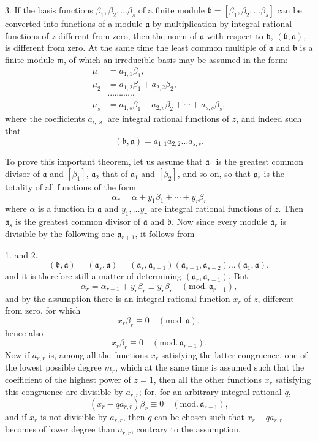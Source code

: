 \documentclass{article}
\begin{document}
3. If the basis functions $\beta_{1}, \beta_{2}, \ldots \beta_{s}$ of a finite module $\mathfrak{b} = [\beta_{1}, \beta_{2}, \ldots \beta_{s}]$ can be converted into functions of a module $\mathfrak{a}$ by multiplication by integral rational functions of $z$ different from zero, then the norm of $\mathfrak{a}$ with respect to $\mathfrak{b}$, $(\mathfrak{b}, \mathfrak{a})$, is different from zero. At the same time the least common multiple of $\mathfrak{a}$ and $\mathfrak{b}$ is a finite module $\mathfrak{m}$, of which an irreducible basis may be assumed in the form:
\[ \begin{aligned} \mu_{1} &= a_{1,1}\beta_{1}, \\ \mu_{2} &= a_{1,2}\beta_{1} + a_{2,2}\beta_{2}, \\ &\cdots\cdots\cdots\cdots \\ \mu_{s} &= a_{1,s}\beta_{1} + a_{2,s}\beta_{2} + \cdots + a_{s,s}\beta_{s}, \end{aligned} \]
where the coefficients $a_{\iota,\varkappa}$ are integral rational functions of $z$, and indeed such that
\[ (\mathfrak{b}, \mathfrak{a}) = a_{1,1}a_{2,2}\ldots a_{s,s}. \]

To prove this important theorem, let us assume that $\mathfrak{a}_{1}$ is the greatest common divisor of $\mathfrak{a}$ and $[\beta_{1}]$, $\mathfrak{a}_{2}$ that of $\mathfrak{a}_{1}$ and $[\beta_{2}]$, and so on, so that $\mathfrak{a}_{r}$ is the totality of all functions of the form
\[ \alpha_{r} = \alpha + y_{1}\beta_{1} + \cdots + y_{r}\beta_{r} \]
where $\alpha$ is a function in $\mathfrak{a}$ and $y_{1}, \ldots y_{r}$ are integral rational functions of $z$. Then $\mathfrak{a}_{s}$ is the greatest common divisor of $\mathfrak{a}$ and $\mathfrak{b}$. Now since every module $\mathfrak{a}_{r}$ is divisible by the following one $\mathfrak{a}_{r+1}$, it follows from

1. and 2.
\[ (\mathfrak{b}, \mathfrak{a}) = (\mathfrak{a}_{s}, \mathfrak{a}) = (\mathfrak{a}_{s}, \mathfrak{a}_{s-1})(\mathfrak{a}_{s-1}, \mathfrak{a}_{s-2})\ldots(\mathfrak{a}_{1}, \mathfrak{a}), \]
and it is therefore still a matter of determining $(\mathfrak{a}_{r}, \mathfrak{a}_{r-1})$. But
\[ \alpha_{r} = \alpha_{r-1} + y_{r}\beta_{r} \equiv y_{r}\beta_{r} \quad (\text{mod.}\,\mathfrak{a}_{r-1}), \]
and by the assumption there is an integral rational function $x_{r}$ of $z$, different from zero, for which
\[ x_{r}\beta_{r} \equiv 0 \quad (\text{mod.}\,\mathfrak{a}), \]
hence also
\[ x_{r}\beta_{r} \equiv 0 \quad (\text{mod.}\,\mathfrak{a}_{r-1}). \]
Now if $a_{r,r}$ is, among all the functions $x_{r}$ satisfying the latter congruence, one of the lowest possible degree $m_{r}$, which at the same time is assumed such that the coefficient of the highest power of $z = 1$, then all the other functions $x_{r}$ satisfying this congruence are divisible by $a_{r,r}$; for, for an arbitrary integral rational $q$,
\[ (x_{r} - qa_{r,r})\beta_{r} \equiv 0 \quad (\text{mod.}\,\mathfrak{a}_{r-1}), \]
and if $x_{r}$ is not divisible by $a_{r,r}$, then $q$ can be chosen such that $x_{r} - qa_{r,r}$ becomes of lower degree than $a_{r,r}$, contrary to the assumption.
\end{document}
